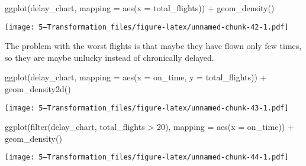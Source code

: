 \documentclass[
]{article}
\newenvironment{Shaded}{\begin{snugshade}}{\end{snugshade}}
\newcommand{\AttributeTok}[1]{\textcolor[rgb]{0.77,0.63,0.00}{#1}}
\newcommand{\DecValTok}[1]{\textcolor[rgb]{0.00,0.00,0.81}{#1}}
\newcommand{\FunctionTok}[1]{\textcolor[rgb]{0.00,0.00,0.00}{#1}}
\newcommand{\NormalTok}[1]{#1}
\newcommand{\SpecialCharTok}[1]{\textcolor[rgb]{0.00,0.00,0.00}{#1}}
\begin{document}
\begin{Shaded}
\begin{Highlighting}[]
\FunctionTok{ggplot}\NormalTok{(delay\_chart, }\AttributeTok{mapping =} \FunctionTok{aes}\NormalTok{(}\AttributeTok{x =}\NormalTok{ total\_flights)) }\SpecialCharTok{+}
    \FunctionTok{geom\_density}\NormalTok{()}
\end{Highlighting}
\end{Shaded}

\texttt{[image: 5---Transformation\_files/figure-latex/unnamed-chunk-42-1.pdf]}

The problem with the worst flights is that maybe they have flown only
few times, so they are maybe unlucky instead of chronically delayed.

\begin{Shaded}
\begin{Highlighting}[]
\FunctionTok{ggplot}\NormalTok{(delay\_chart, }\AttributeTok{mapping =} \FunctionTok{aes}\NormalTok{(}\AttributeTok{x =}\NormalTok{ on\_time, }\AttributeTok{y =}\NormalTok{ total\_flights)) }\SpecialCharTok{+}
  \FunctionTok{geom\_density2d}\NormalTok{()}
\end{Highlighting}
\end{Shaded}

\texttt{[image: 5---Transformation\_files/figure-latex/unnamed-chunk-43-1.pdf]}

\begin{Shaded}
\begin{Highlighting}[]
\FunctionTok{ggplot}\NormalTok{(}\FunctionTok{filter}\NormalTok{(delay\_chart, total\_flights }\SpecialCharTok{\textgreater{}} \DecValTok{20}\NormalTok{), }\AttributeTok{mapping =} \FunctionTok{aes}\NormalTok{(}\AttributeTok{x =}\NormalTok{ on\_time)) }\SpecialCharTok{+}
    \FunctionTok{geom\_density}\NormalTok{() }
\end{Highlighting}
\end{Shaded}

\texttt{[image: 5---Transformation\_files/figure-latex/unnamed-chunk-44-1.pdf]}
\end{document}
